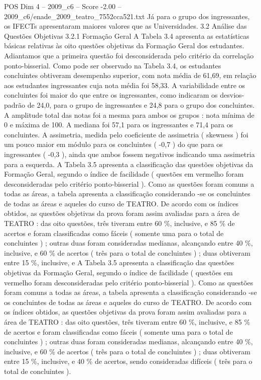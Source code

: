 \begin{textsample}{POS Dim 4 – 2009\_c6 – Score -2.00 – 2009\_c6/enade\_2009\_teatro\_7552cca521.txt}
Já para o grupo dos ingressantes, os IFECTs apresentaram maiores valores que as Universidades. 3.2 Análise das Questões Objetivas 3.2.1 Formação Geral A Tabela 3.4 apresenta as estatísticas básicas relativas às oito questões objetivas da Formação Geral dos estudantes.
Adiantamos que a primeira questão foi desconsiderada pelo critério da correlação ponto-bisserial.
Como pode ser observado na Tabela 3.4, os estudantes concluintes obtiveram desempenho superior, com nota média de 61,69, em relação aos estudantes ingressantes cuja nota média foi 58,33.
A variabilidade entre os concluintes foi maior do que entre os ingressantes, como indicaram os desvios-padrão de 24,0, para o grupo de ingressantes e 24,8 para o grupo dos concluintes.
A amplitude total das notas foi a mesma para ambos os grupos : nota mínima de 0 e máxima de 100.
A mediana foi 57,1 para os ingressantes e 71,4 para os concluintes.
A assimetria, medida pelo coeficiente de assimetria ( skewness ) foi um pouco maior em módulo para os concluintes ( -0,7 ) do que para os ingressantes ( -0,3 ), ainda que ambos fossem negativos indicando uma assimetria para a esquerda.
A Tabela 3.5 apresenta a classificação das questões objetivas da Formação Geral, segundo o índice de facilidade ( questões em vermelho foram desconsideradas pelo critério ponto-bisserial ).
Como as questões foram comuns a todas as áreas, a tabela apresenta a classificação considerando -se os concluintes de todas as áreas e aqueles do curso de TEATRO.
De acordo com os índices obtidos, as questões objetivas da prova foram assim avaliadas para a área de TEATRO : das oito questões, três tiveram entre 60 \%, inclusive, e 85 \% de acertos e foram classificadas como fáceis ( somente uma para o total de concluintes ) ; outras duas foram consideradas medianas, alcançando entre 40 \%, inclusive, e 60 \% de acertos ( três para o total de concluintes ) ; duas obtiveram entre 15 \%, inclusive, e A Tabela 3.5 apresenta a classificação das questões objetivas da Formação Geral, segundo o índice de facilidade ( questões em vermelho foram desconsideradas pelo critério ponto-bisserial ).
Como as questões foram comuns a todas as áreas, a tabela apresenta a classificação considerando -se os concluintes de todas as áreas e aqueles do curso de TEATRO.
De acordo com os índices obtidos, as questões objetivas da prova foram assim avaliadas para a área de TEATRO : das oito questões, três tiveram entre 60 \%, inclusive, e 85 \% de acertos e foram classificadas como fáceis ( somente uma para o total de concluintes ) ; outras duas foram consideradas medianas, alcançando entre 40 \%, inclusive, e 60 \% de acertos ( três para o total de concluintes ) ; duas obtiveram entre 15 \%, inclusive, e 40 \% de acertos, sendo consideradas difíceis ( três para o total de concluintes ).

\end{textsample}
